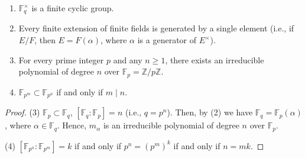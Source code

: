 \documentclass[twoside]{article}
\newcommand\Z{\mathbb Z}
\newcommand\F{\mathbb F}
\theoremstyle{remark}
\begin{document}
\begin{corollary}
  \begin{enumerate}[label=\textup{(\arabic*)}, nosep]
    \item \(\F_q^\times\) is a finite cyclic group.
    \item Every finite extension of finite fields is generated by a single element (i.e., if \(E/F\), then \(E = F(\alpha)\), where \(\alpha\) is a generator of \(E^\times\)).
    \item For every prime integer \(p\) and any \(n \geq 1\), there exists an irreducible polynomial of degree \(n\) over \(\F_p = \Z/p\Z\).
    \item \(\F_{p^m} \subset \F_{p^n}\) if and only if \(m \mid n\).
  \end{enumerate}
\end{corollary}

\begin{proof}
  (3) \(\F_p \subset \F_q\), \([\F_q:\F_p] = n\) (i.e., \(q = p^n\)). Then, by (2) we have \(\F_q = \F_p(\alpha)\), where \(\alpha \in \F_q\). Hence, \(m_\alpha\) is an irreducible polynomial of degree \(n\) over \(\F_p\).
  
  \smallskip
  
  (4) \([\F_{p^n}:\F_{p^m}] = k\) if and only if \(p^n = (p^m)^k\) if and only if \(n = mk\).
\end{proof}
\end{document}
